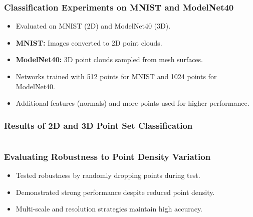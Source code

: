 \documentclass[11pt,xcolor={dvipsnames},hyperref={pdftex,pdfpagemode=UseNone,hidelinks,pdfdisplaydoctitle=true},usepdftitle=false]{beamer}
\begin{document}
\begin{frame}
\frametitle{Classification Experiments on MNIST and ModelNet40}
\begin{itemize}
    \item Evaluated on MNIST (2D) and ModelNet40 (3D).
    \item \textbf{MNIST:} Images converted to 2D point clouds.
    \item \textbf{ModelNet40:} 3D point clouds sampled from mesh surfaces.
    \item Networks trained with 512 points for MNIST and 1024 points for ModelNet40.
    \item Additional features (normals) and more points used for higher performance.
\end{itemize}
\end{frame}

\begin{frame}
\frametitle{Results of 2D and 3D Point Set Classification}
\begin{columns}
    \centering
    
\end{columns}
\end{frame}

\begin{frame}
\frametitle{Evaluating Robustness to Point Density Variation}
\begin{itemize}
    \item Tested robustness by randomly dropping points during test.
    \item Demonstrated strong performance despite reduced point density.
    \item Multi-scale and resolution strategies maintain high accuracy.
\end{itemize}
\end{frame}
\end{document}
